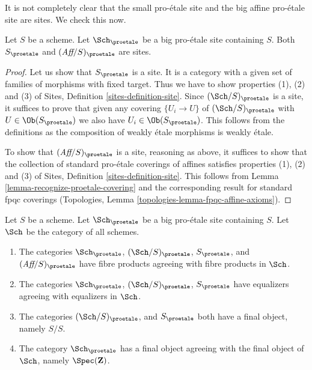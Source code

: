 \noindent
It is not completely clear that the small pro-\'etale site and
the big affine pro-\'etale site are sites. We check this now.

\begin{lemma}
\label{lemma-verify-site-proetale}
Let $S$ be a scheme. Let $\Sch_\proetale$ be a big pro-\'etale site
containing $S$. Both $S_\proetale$ and $(\textit{Aff}/S)_\proetale$ are sites.
\end{lemma}

\begin{proof}
Let us show that $S_\proetale$ is a site. It is a category with a
given set of families of morphisms with fixed target. Thus we
have to show properties (1), (2) and (3) of
Sites, Definition \ref{sites-definition-site}.
Since $(\Sch/S)_\proetale$ is a site, it suffices to prove
that given any covering $\{U_i \to U\}$ of $(\Sch/S)_\proetale$
with $U \in \Ob(S_\proetale)$ we also have $U_i \in \Ob(S_\proetale)$.
This follows from the definitions
as the composition of weakly \'etale morphisms is weakly \'etale.

\medskip\noindent
To show that $(\textit{Aff}/S)_\proetale$ is a site, reasoning as above,
it suffices to show that the collection of standard pro-\'etale coverings
of affines satisfies properties (1), (2) and (3) of
Sites, Definition \ref{sites-definition-site}.
This follows from Lemma \ref{lemma-recognize-proetale-covering}
and the corresponding result for standard fpqc coverings
(Topologies, Lemma \ref{topologies-lemma-fpqc-affine-axioms}).
\end{proof}

\begin{lemma}
\label{lemma-fibre-products-proetale}
Let $S$ be a scheme. Let $\Sch_\proetale$ be a big pro-\'etale
site containing $S$. Let $\Sch$ be the category of all schemes.
\begin{enumerate}
\item The categories $\Sch_\proetale$, $(\Sch/S)_\proetale$,
$S_\proetale$, and $(\textit{Aff}/S)_\proetale$ have fibre products
agreeing with fibre products in $\Sch$.
\item The categories $\Sch_\proetale$, $(\Sch/S)_\proetale$,
$S_\proetale$ have equalizers agreeing with equalizers in $\Sch$.
\item The categories $(\Sch/S)_\proetale$, and $S_\proetale$ both have
a final object, namely $S/S$.
\item The category $\Sch_\proetale$ has a final object agreeing
with the final object of $\Sch$, namely $\Spec(\mathbf{Z})$.
\end{enumerate}
\end{lemma}

